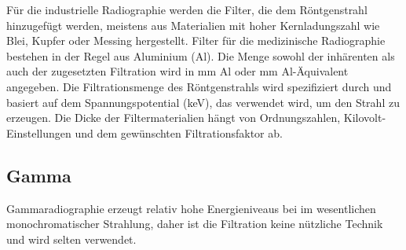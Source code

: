 Für die industrielle Radiographie werden die Filter, die dem Röntgenstrahl hinzugefügt werden, meistens aus Materialien mit hoher Kernladungszahl wie Blei, Kupfer oder Messing hergestellt. Filter für die medizinische Radiographie bestehen in der Regel aus Aluminium (Al). Die Menge sowohl der inhärenten als auch der zugesetzten Filtration wird in mm Al oder mm Al-Äquivalent angegeben. Die Filtrationsmenge des Röntgenstrahls wird spezifiziert durch und basiert auf dem Spannungspotential (keV), das verwendet wird, um den Strahl zu erzeugen. Die Dicke der Filtermaterialien hängt von Ordnungszahlen, Kilovolt-Einstellungen und dem gewünschten Filtrationsfaktor ab.

\subsection{Gamma}
Gammaradiographie erzeugt relativ hohe Energieniveaus bei im wesentlichen monochromatischer Strahlung, daher ist die Filtration keine nützliche Technik und wird selten verwendet.\\



